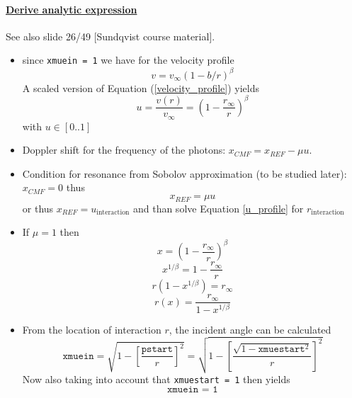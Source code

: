 \documentclass[../main/main.tex]{subfiles}
\begin{document}
\paragraph{\underline{Derive analytic expression}} See also slide  26/49 [Sundqvist course material]. 
\begin{itemize}
\item since \texttt{xmuein = 1} we have for the velocity profile 
\begin{equation}
v = v_{\infty}(1-b/r)^{\beta}
\label{velocity_profile}
\end{equation}
A scaled version of Equation (\ref{velocity_profile}) yields 
\begin{equation}
u = \frac{v(r)}{v_{\infty}} = \left(1 - \frac{r_{\infty}}{r} \right)^{\beta} 
\label{u_profile}
\end{equation}
with $u \in [0..1]$

\item Doppler shift for the frequency of the photons: $x_{CMF} = x_{REF} - \mu u$.
\item Condition for resonance from Sobolov approximation (to be studied later): $\boxed{x_{CMF}= 0}$ thus 
\begin{equation}
x_{REF} = \mu u
\label{analytic_profile}
\end{equation}
or thus $x_{REF} = \boxed{u_{\text{interaction}}}$ and than solve Equation \ref{u_profile} for $r_{\text{interaction}}$


\item If $\mu = 1$ then 
\begin{equation}
x = \left(1 - \frac{r_{\infty}}{r} \right)^{\beta}
\end{equation}
\begin{equation*}
x^{1/\beta} = 1 - \frac{r_{\infty}}{r}
\end{equation*}
\begin{equation*}
r(1-x^{1/\beta}) = r_{\infty}
\end{equation*}
\begin{equation}
\boxed{r(x) = \frac{r_{\infty}}{1-x^{1/\beta}}}
\end{equation}

\noindent{} 

\item From the location of interaction $r$, the incident angle can be calculated
\begin{equation}
\texttt{xmuein} = \sqrt{1-\left[\frac{\texttt{pstart}}{r}\right]^2} = \sqrt{1 - \left[ \frac{\sqrt{1-\texttt{xmuestart}^2}}{r} \right]^2}
\end{equation}
Now also taking into account that \texttt{xmuestart = 1} then yields
\begin{equation}
\texttt{xmuein = 1}
\end{equation}


\end{itemize}
\end{document}
